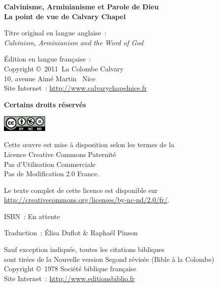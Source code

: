 \newpage
\mbox{}
\vfill

{\scriptsize

{\bfseries Calvinisme, Arminianisme et Parole de Dieu\\
La point de vue de Calvary Chapel}

Titre original en langue anglaise~:\\
\emph{Calvinism, Arminianism and the Word of God}

Édition en langue française~:\\
Copyright \copyright{}~2011~La Colombe Calvary\\
 10, avenue Aimé Martin ~Nice\\
Site Internet~: \url{http://www.calvarychapelnice.fr}

{\bfseries Certains droits réservés}

\includegraphics[width=6em]{by-nc-nd_eu}

Cette \oe{}uvre est mise à disposition selon les termes de la \\
 Licence Creative Commons Paternité \\
 \ocadr Pas d'Utilisation Commerciale \\
 \ocadr Pas de Modification 2.0 France.

Le texte complet de cette licence est disponible sur \\
 \url{http://creativecommons.org/licenses/by-nc-nd/2.0/fr/}.

ISBN~: En attente

Traduction~: Élisa Duflot \& Raphaël Pinson

Sauf exception indiquée, toutes les citations bibliques \\
 sont tirées de la Nouvelle version Segond révisée (Bible à la Colombe) \\
 Copyright \copyright{}~1978 Société biblique française \\
Site Internet~: \url{http://www.editionsbiblio.fr}

}
\enlargethispage{\footskip}

